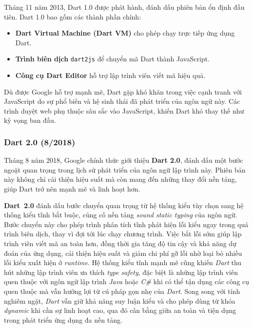 \documentclass[../DoAn.tex]{subfiles}
\numberwithin{figure}{chapter}
\begin{document}
Tháng 11 năm 2013, Dart 1.0 được phát hành, đánh dấu phiên bản ổn định đầu tiên. Dart 1.0 bao gồm các thành phần chính:

\begin{itemize}
    \item \textbf{Dart Virtual Machine (Dart VM)} cho phép chạy trực tiếp ứng dụng Dart.
    \item \textbf{Trình biên dịch} \texttt{dart2js} để chuyển mã Dart thành JavaScript.
    \item \textbf{Công cụ Dart Editor} hỗ trợ lập trình viên viết mã hiệu quả.
\end{itemize}

Dù được Google hỗ trợ mạnh mẽ, Dart gặp khó khăn trong việc cạnh tranh với JavaScript do sự phổ biến và hệ sinh thái đã phát triển của ngôn ngữ này. Các trình duyệt web phụ thuộc sâu sắc vào JavaScript, khiến Dart khó thay thế như kỳ vọng ban đầu.

\subsubsection{Dart 2.0 (8/2018)}

Tháng 8 năm 2018, Google chính thức giới thiệu \textbf{Dart 2.0}, đánh dấu một bước ngoặt quan trọng trong lịch sử phát triển của ngôn ngữ lập trình này. Phiên bản này không chỉ cải thiện hiệu suất mà còn mang đến những thay đổi nền tảng, giúp Dart trở nên mạnh mẽ và linh hoạt hơn.

    
\textbf{Dart~2.0} đánh dấu bước chuyển quan trọng từ hệ thống kiểu tùy chọn sang hệ thống kiểu tĩnh bắt buộc, củng cố nền tảng \textit{sound static typing} của ngôn ngữ. Bước chuyển này cho phép trình phân tích tĩnh phát hiện lỗi kiểu ngay trong quá trình biên dịch, thay vì đợi tới lúc chạy chương trình. Việc bắt lỗi sớm giúp lập trình viên viết mã an toàn hơn, đồng thời gia tăng độ tin cậy và khả năng dự đoán của ứng dụng, cải thiện hiệu suất và giảm chi phí gỡ lỗi nhờ loại bỏ nhiều lỗi kiểu xuất hiện ở \textit{runtime}. Hệ thống kiểu tĩnh mạnh mẽ cũng khiến \textit{Dart} thu hút những lập trình viên ưa thích \textit{type safety}, đặc biệt là những lập trình viên quen thuộc với ngôn ngữ lập trình \textit{Java} hoặc \textit{C\#} khi có thể tận dụng các công cụ quen thuộc mà vẫn hưởng lợi từ cú pháp gọn nhẹ của \textit{Dart}. Song song với tính nghiêm ngặt, \textit{Dart} vẫn giữ khả năng suy luận kiểu và cho phép dùng từ khóa \textit{dynamic} khi cần sự linh hoạt cao, qua đó cân bằng giữa an toàn và tiện dụng trong phát triển ứng dụng đa nền tảng.
\end{document}
